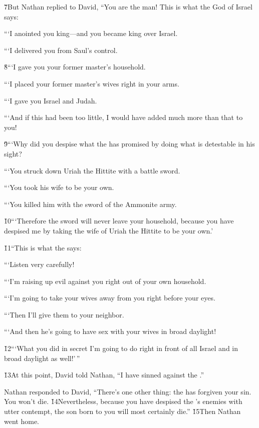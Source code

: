 \v{7}But Nathan replied to David, ``You are the man! This is what the  God of Israel says:

```I anointed you king---and you became king over Israel.

```I delivered you from Saul's control.

\v{8}```I gave you your former master's household.

```I placed your former master's wives right in your arms.

```I gave you Israel and Judah.

```And if this had been too little, I would have added much more than that to you!

\v{9}```Why did you despise what the  has promised by doing what is detestable in his sight?

```You struck down Uriah the Hittite with a battle sword.

```You took his wife to be your own.

```You killed him with the sword of the Ammonite army.

\v{10}```Therefore the sword will never leave your household, because you have despised me by taking the wife of Uriah the Hittite to be your own.'

\v{11}``This is what the  says:

```Listen very carefully!

```I'm raising up evil against you right out of your own household.

```I'm going to take your wives away from you right before your eyes.

```Then I'll give them to your neighbor.

```And then he's going to have sex with your wives in broad daylight!

\v{12}```What you did in secret I'm going to do right in front of all Israel and in broad daylight as well!'\,''

\v{13}At this point, David told Nathan, ``I have sinned against the .''

Nathan responded to David, ``There's one other thing: the  has forgiven your sin. You won't die. \v{14}Nevertheless, because you have despised the 's enemies with utter contempt, the son born to you will most certainly die.'' \v{15}Then Nathan went home.

